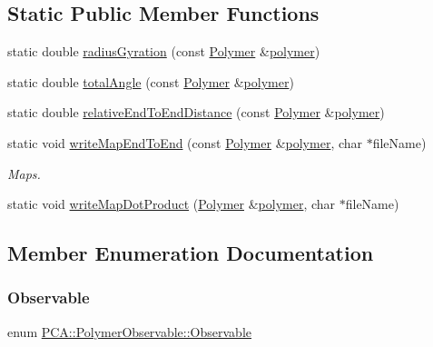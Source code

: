 \subsection*{Static Public Member Functions}
\begin{DoxyCompactItemize}
\item 
static double \hyperlink{class_p_c_a_1_1_polymer_observable_afd34b4d18155d642009a3d3c73f40882}{radius\+Gyration} (const \hyperlink{class_p_c_a_1_1_polymer}{Polymer} \&\hyperlink{classpolymer}{polymer})
\item 
static double \hyperlink{class_p_c_a_1_1_polymer_observable_ae5b2dbf1d87aa54347f2a66bfb24e78b}{total\+Angle} (const \hyperlink{class_p_c_a_1_1_polymer}{Polymer} \&\hyperlink{classpolymer}{polymer})
\item 
static double \hyperlink{class_p_c_a_1_1_polymer_observable_a72ff49d3aed6660b0bd7a8175f3b436e}{relative\+End\+To\+End\+Distance} (const \hyperlink{class_p_c_a_1_1_polymer}{Polymer} \&\hyperlink{classpolymer}{polymer})
\item 
static void \hyperlink{class_p_c_a_1_1_polymer_observable_ac63e1b37da93eca84e21916f01279a59}{write\+Map\+End\+To\+End} (const \hyperlink{class_p_c_a_1_1_polymer}{Polymer} \&\hyperlink{classpolymer}{polymer}, char $\ast$file\+Name)
\begin{DoxyCompactList}\small\item\em Maps. \end{DoxyCompactList}\item 
static void \hyperlink{class_p_c_a_1_1_polymer_observable_aa41850ca819c76bdceeb644e0a570c46}{write\+Map\+Dot\+Product} (\hyperlink{class_p_c_a_1_1_polymer}{Polymer} \&\hyperlink{classpolymer}{polymer}, char $\ast$file\+Name)
\end{DoxyCompactItemize}


\subsection{Member Enumeration Documentation}
\hypertarget{class_p_c_a_1_1_polymer_observable_a6dcabbc3bc249018c2c94825bff2c94f}{}\label{class_p_c_a_1_1_polymer_observable_a6dcabbc3bc249018c2c94825bff2c94f} 
\subsubsection{\texorpdfstring{Observable}{Observable}}
{\footnotesize\ttfamily enum \hyperlink{class_p_c_a_1_1_polymer_observable_a6dcabbc3bc249018c2c94825bff2c94f}{P\+C\+A\+::\+Polymer\+Observable\+::\+Observable}}

